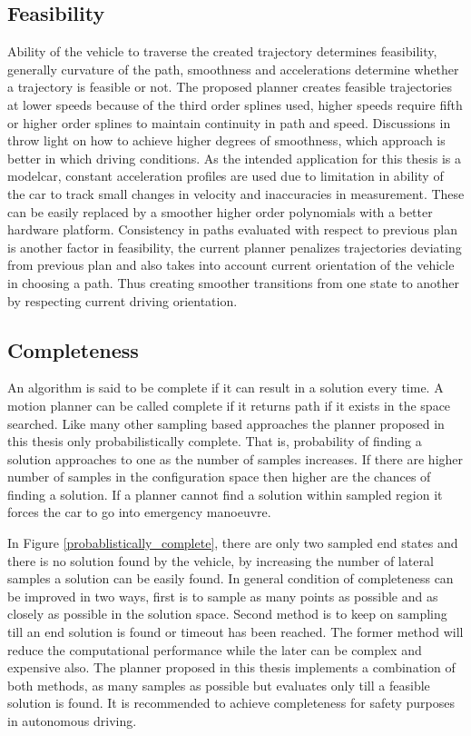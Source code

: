 \subsection{Feasibility}
\label{feasibility}
Ability of the vehicle to traverse the created trajectory determines feasibility, generally curvature of the path, smoothness and accelerations determine whether a trajectory is feasible or not. The proposed planner creates feasible trajectories at lower speeds because of the third order splines used, higher speeds require fifth or higher order splines to maintain continuity in path and speed. Discussions in \cite{cmu_parallel_thesis} \cite{ppt_teqniqs_coll_Avdnce} throw light on how to achieve higher degrees of smoothness, which approach is better in which driving conditions. As the intended application for this thesis is a modelcar, constant acceleration profiles are used due to limitation in ability of the car to track small changes in velocity and inaccuracies in measurement. These can be easily replaced by a smoother higher order polynomials with a better hardware platform. Consistency in paths evaluated with respect to previous plan is another factor in feasibility, the current planner penalizes trajectories deviating from previous plan and also takes into account current orientation of the vehicle in choosing a path. Thus creating smoother transitions from one state to another by respecting current driving orientation. 

\subsection{Completeness}
\label{completeness}
An algorithm is said to be complete if it can result in a solution every time. A motion planner can be called complete if it returns path if it exists in the space searched. Like many other sampling based approaches the planner proposed in this thesis only probabilistically complete. That is, probability of finding a solution approaches to one as the number of samples increases. If there are higher number of samples in the configuration space then higher are the chances of finding a solution. If a planner cannot find a solution within sampled region it forces the car to go into emergency manoeuvre. 

In Figure \ref{probablistically_complete}, there are only two sampled end states and there is no solution found by the vehicle, by increasing the number of lateral samples a solution can be easily found. In general condition of completeness can be improved in two ways, first is to sample as many points as possible and as closely as possible in the solution space. Second method is to keep on sampling till an end solution is found or timeout has been reached. The former method will reduce the computational performance while the later can be complex and expensive also. The planner proposed in this thesis implements a combination of both methods, as many samples as possible but evaluates only till a feasible solution is found. It is recommended to achieve completeness for safety purposes in autonomous driving. 

